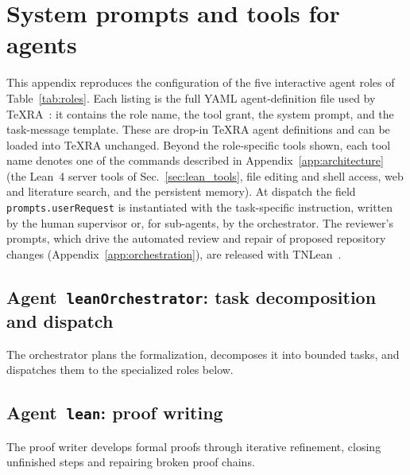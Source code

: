 \clearpage
\onecolumngrid

\section{System prompts and tools for agents}\label{app:prompts}

This appendix reproduces the configuration of the five interactive
agent roles of Table~\ref{tab:roles}. Each listing is the full YAML
agent-definition file used by TeXRA~\cite{TeXRA}: it contains the role name, the tool grant,
the system prompt, and the task-message template. These are drop-in TeXRA agent
definitions and can be loaded into TeXRA unchanged. Beyond the role-specific
tools shown, each tool name denotes one of the commands described in
Appendix~\ref{app:architecture} (the Lean~4 server tools of
Sec.~\ref{sec:lean_tools}, file editing and shell access, web and literature
search, and the persistent memory). At dispatch the field
\texttt{prompts.userRequest} is instantiated with the task-specific
instruction, written by the human supervisor or, for sub-agents, by the
orchestrator.
The reviewer's prompts, which drive the automated review and
repair of proposed repository changes (Appendix~\ref{app:orchestration}), are
released with TNLean~\cite{TNLean}.


\subsection{Agent~\texttt{leanOrchestrator}: task decomposition and dispatch}\label{sec:prompt_leanorchestrator}

The orchestrator plans the formalization, decomposes it into bounded tasks, and
dispatches them to the specialized roles below.



\subsection{Agent~\texttt{lean}: proof writing}\label{sec:prompt_lean}

The proof writer develops formal proofs through iterative refinement, closing
unfinished steps and repairing broken proof chains.



